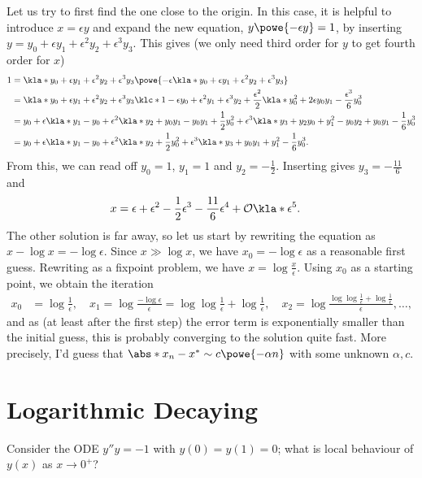 \documentclass[english, parskip=full]{scrartcl}
\begin{document}
Let us try to first find the one close to the origin.
In this case, it is helpful to introduce $x=\epsilon y$ and expand the new equation, $y \powe{-\epsilon y} = 1$, by inserting $y=y_0 + \epsilon y_1 + \epsilon^2 y_2 + \epsilon^3 y_3$.
This gives (we only need third order for $y$ to get fourth order for $x$)
\begin{align}
1 &= \kla*{y_0 + \epsilon y_1 + \epsilon^2 y_2 + \epsilon^3 y_3} \powe{-\epsilon \kla*{y_0 + \epsilon y_1 + \epsilon^2 y_2 + \epsilon^3 y_3}}\\
&= \kla*{y_0 + \epsilon y_1 + \epsilon^2 y_2 + \epsilon^3 y_3} \klc*{1 - \epsilon y_0 + \epsilon^2 y_1 + \epsilon^3 y_2 + \frac{\epsilon^2}{2} \kla*{y_0^2 + 2\epsilon y_0 y_1} - \frac{\epsilon^3}{6}y_0^3}\\
&= y_0 + \epsilon \kla*{y_1 - y_0} + \epsilon^2 \kla*{y_2 + y_0y_1 - y_0y_1 + \frac{1}{2} y_0^2} + \epsilon^3 \kla*{y_3 + y_2y_0+y_1^2-y_0y_2 + y_0y_1-\frac{1}{6} y_0^3}\\
&= y_0 + \epsilon\kla*{y_1 - y_0} + \epsilon^2 \kla*{y_2 + \frac{1}{2} y_0^2} + \epsilon^3 \kla*{y_3 + y_0y_1 + y_1^2 - \frac{1}{6} y_0^3}.
\end{align}
From this, we can read off $y_0=1$, $y_1=1$ and $y_2=-\frac{1}{2}$.
Inserting gives $y_3 = -\frac{11}{6}$ and
\begin{align}
x &= \epsilon + \epsilon^2 - \frac{1}{2} \epsilon^3 - \frac{11}{6} \epsilon^4 + \mathcal{O}\kla*{\epsilon^5}.
\end{align}
The other solution is far away, so let us start by rewriting the equation as $x - \log x = -\log \epsilon$.
Since $x\gg \log x$, we have $x_0 = -\log \epsilon$ as a reasonable first guess.
Rewriting as a fixpoint problem, we have $x = \log \frac{x}{\epsilon}$.
Using $x_0$ as a starting point, we obtain the iteration
\begin{align}
x_0 &= \log\frac{1}{\epsilon}, \quad x_1 = \log \frac{-\log \epsilon}{\epsilon} = \log\log \frac{1}{\epsilon} + \log \frac{1}{\epsilon}, \quad x_2 = \log \frac{\log\log \frac{1}{\epsilon} + \log \frac{1}{\epsilon}}{\epsilon},\dots,
\end{align}
and as (at least after the first step) the error term is exponentially smaller than the initial guess, this is probably converging to the solution quite fast.
More precisely, I'd guess that $\abs*{x_n - x^\ast} \sim c\powe{-\alpha n}$ with some unknown $\alpha,c$.
\section{Logarithmic Decaying}
Consider the ODE $y''y = -1$ with $y(0)=y(1)=0$; what is local behaviour of $y(x)$ as $x\rightarrow 0^+$?
\end{document}
